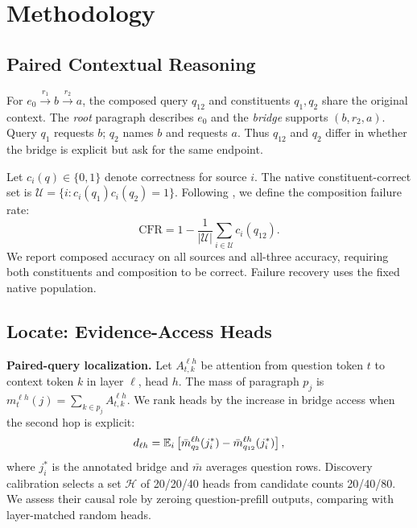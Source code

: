 \section{Methodology}\label{sec:method}
\subsection{Paired Contextual Reasoning}\label{sec:triplets}
For $e_0\xrightarrow{r_1}b\xrightarrow{r_2}a$, the composed query $q_{12}$ and constituents $q_1,q_2$ share the original context. The \emph{root} paragraph describes $e_0$ and the \emph{bridge} supports $(b,r_2,a)$. Query $q_1$ requests $b$; $q_2$ names $b$ and requests $a$. Thus $q_{12}$ and $q_2$ differ in whether the bridge is explicit but ask for the same endpoint.

Let $c_i(q)\in\{0,1\}$ denote correctness for source $i$. The native constituent-correct set is $\mathcal U=\{i:c_i(q_1)c_i(q_2)=1\}$. Following \citet{press2023compositionality}, we define the composition failure rate:
\begin{equation}\mathrm{CFR}=1-\frac{1}{|\mathcal U|}\sum_{i\in\mathcal U}c_i(q_{12}).\label{eq:cfr}\end{equation}
We report composed accuracy on all sources and all-three accuracy, requiring both constituents and composition to be correct. Failure recovery uses the fixed native population.
\subsection{Locate: Evidence-Access Heads}\label{sec:localize}
\textbf{Paired-query localization.} Let $A^{\ell h}_{t,k}$ be attention from question token $t$ to context token $k$ in layer $\ell$, head $h$. The mass of paragraph $p_j$ is $m_t^{\ell h}(j)=\sum_{k\in p_j} A^{\ell h}_{t,k}$. We rank heads by the increase in bridge access when the second hop is explicit:
\begin{equation}d_{\ell h}=\mathbb{E}_i\left[\bar m^{\ell h}_{q_2}(j_i^*)-\bar m^{\ell h}_{q_{12}}(j_i^*)\right],\label{eq:ranking}\end{equation}
where $j_i^*$ is the annotated bridge and $\bar m$ averages question rows. Discovery calibration selects a set $\mathcal{H}$ of 20/20/40 heads from candidate counts 20/40/80. We assess their causal role by zeroing question-prefill outputs, comparing with layer-matched random heads.

